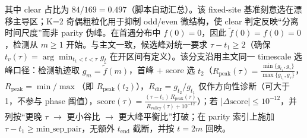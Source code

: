 其中 clear 占比为 $84/169=0.497$（脚本自动汇总）。该 fixed-site 基准刻意选在漂移主导区；K=2 奇偶粗粒化用于抑制 odd/even 微结构，使 clear 判定反映“分离时间尺度”而非 parity 伪峰。在首遇分布中 $f(0)=0$，因此 $\widetilde f(0)=f(0)=0$，检测从 $m\ge1$ 开始。与主文一致，候选峰对统一要求 $\tau-t_1\ge 2$（确保 $t_v(\tau)=\arg\min_{t_1<t<\tau}g_t$ 在开区间有定义）。该分支沿用主文同一 timescale 选峰口径：检测轨迹取 $g_m=\bar{\widetilde f}(m)$，首峰 + score 选 $t_2$（$R_{\mathrm{peak}}(\tau)=\frac{\min\{g_{t_1},g_{\tau}\}}{\max\{g_{t_1},g_{\tau}\}}$，$R_{\mathrm{peak}}=\min/\max$（即 $R_{\mathrm{peak}}(t_2)$），$R_{\mathrm{dir}}=g_{t_2}/g_{t_1}$ 仅作方向性诊断（可大于 1，不参与 phase 阈值），$\mathrm{score}(\tau)=\frac{(\tau-t_1)\,R_{\mathrm{peak}}(\tau)}{R_{\mathrm{valley}}(\tau)+10^{-12}}$）；若 $|\Delta\mathrm{score}|\le10^{-12}$，并列按“更晚 $\tau$ $\rightarrow$ 更小谷比 $\rightarrow$ 更大峰平衡比”打破；在 parity 索引上施加 $\tau-t_1\ge\mathrm{min\_sep\_pair}$，无额外 $t_{\mathrm{end}}$ 截断，并按 $t=2m$ 回映。
